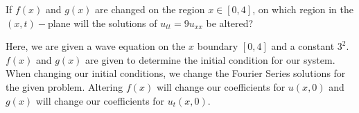 \item If $f(x)$ and $g(x)$ are changed on the region $x \in [0, 4]$, on which region in the $(x, t)-$plane will the solutions of $u_{tt} = 9u_{xx}$ be altered?

Here, we are given a wave equation on the $x$ boundary $[0, 4]$ and a constant $3^2$. $f(x)$ and $g(x)$ are given to determine the initial condition for our system. When changing our initial conditions, we change the Fourier Series solutions for the given problem. Altering $f(x)$ will change our coefficients for $u(x,0)$ and $g(x)$ will change our coefficients for $u_t(x, 0)$.
